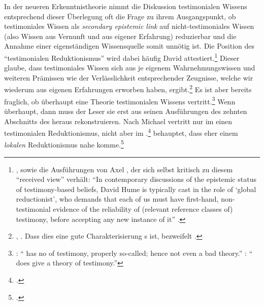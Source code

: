 In der neueren Erkenntnistheorie nimmt die Diskussion testimonialen Wissens
entsprechend dieser Überlegung oft die Frage zu ihrem Ausgangspunkt, ob testimoniales
Wissen als \emph{secondary epistemic link} auf nicht-testimoniales Wissen (also
Wissen aus Vernunft und aus eigener Erfahrung) reduzierbar und die Annahme einer eigenständigen Wissensquelle somit
unnötig ist. Die Position des \enquote{testimonialen Reduktionismus} wird dabei
häufig David  attestiert.\footnote{\cite[Siehe
z.\,B.][532]{Grundmann:AnalytischeEinfuehrungindieErkenntnistheorie2008}, sowie
die Ausführungen von Axel
\textcite[vgl.][]{Gelfert:HumeonTestimonyRevisited2010}, der sich selbst
kritisch zu diesem \enquote{received view} verhält: \enquote{In contemporary
discussions of the epistemic status of testimony-based beliefs, David Hume is
typically cast in the role of \enquote{global reductionist}, who demands that
each of us must have first-hand, non-testimonial evidence of the reliability of
(relevant reference classes of) testimony, before accepting any new instance of
it} \parencite[][60]{Gelfert:HumeonTestimonyRevisited2010}.} Dieser glaube, dass
testimoniales Wissen sich aus je eigenem Wahrnehmungswissen und weiteren Prämissen wie der Verlässlichkeit entsprechender
Zeugnisse, welche wir wiederum aus eigenen Erfahrungen erworben haben,
ergibt.\footnote{\cite[Vgl.][46,
48]{Wilholt:SozialeErkenntnistheorie2007}, \cite[][144]{Audi:Epistemology1998}.
Dass dies eine gute Charakterisierung s ist, bezweifelt
\textcite{Gelfert:HumeonTestimonyRevisited2010}.} Es ist aber bereits fraglich, ob 
überhaupt eine Theorie testimonialen Wissens
vertritt.\footnote{\cite[Vgl.][410]{Welbourne:IsHumeReallyaReductivist2002}:
\enquote{ has no  of testimony, properly so-called; hence
not even a bad theory.}
\cite[Ebenso][303]{Faulkner:DavidHumesReductionistEpistemologyofTestimony1998}:
\enquote{ does  give a theory of testimony.}} Wenn
überhaupt, dann muss der Leser sie erst aus seinen Ausführungen des zehnten
Abschnitts des  heraus
rekonstruieren.
Nach Michael  vertritt  nur im
 einen testimonialen Reduktionismus, nicht aber im
.\footnote{\cite[Vgl.][]{Root:HumeontheVirtuesofTestimony2001}.}
 behauptet, dass  eher einem
\emph{lokalen} Reduktionismus nahe komme.\footnote{\cite[Vgl.][73]{Gelfert:HumeonTestimonyRevisited2010}.}
